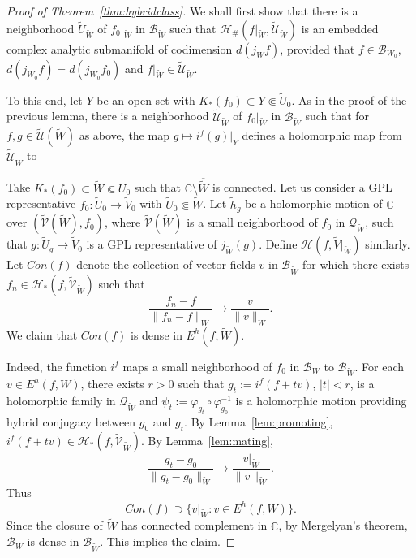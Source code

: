 \documentclass{amsart}
\numberwithin{equation}{section}
\newcommand{\C}{\mathbb C}
\theoremstyle{definition}
\theoremstyle{remark}
\begin{document}
\begin{proof}[Proof of Theorem~\ref{thm:hybridclass}]
\iffalse
We shall first show that there is a neighborhood $\widetilde{U}_{\widetilde{W}}$ of $f_0|_{\widetilde{W}}$ in $\mathcal{B}_{\widetilde{W}}$ such that 
$\mathcal{H}_\#(f|_{\widetilde{W}}, \widetilde{\mathcal{U}}_{\widetilde{W}})$ is an embedded complex analytic submanifold of codimension $d(j_Wf)$, provided that $f\in \mathcal{B}_{W_0}$, $d(j_{W_0}f)= d(j_{W_0} f_0)$ and $f|_{\widetilde{W}}\in \widetilde{\mathcal{U}}_{\widetilde{W}}$.

To this end, let $Y$ be an open set with $K_*(f_0)\subset Y\Subset\widetilde{U}_0$.
As in the proof of the previous lemma, there is a neighborhood $\widetilde{\mathcal{U}}_{\widetilde{W}}$ of $f_0|_{\widetilde{W}}$ in $\mathcal{B}_{\widetilde{W}}$ such that for $f,g\in \widetilde{\mathcal{U}}(\widetilde{W})$ as above, 
the map $g\mapsto i^f(g)|_Y$ defines a holomorphic map from $\widetilde{\mathcal{U}}_{\widetilde{W}}$ to 

Take $K_*(f_0)\subset\widetilde{W}\Subset U_0$ such that $\C\setminus \overline{\widetilde{W}}$ is connected. Let us consider a GPL representative $f_0:\widetilde{U}_0\to \widetilde{V}_0$ with $\widetilde{U}_0\Subset \widetilde{W}$. Let $\widetilde{h}_g$ be a holomorphic motion of $\C$ over $(\widetilde{\mathcal{V}}(\widetilde{W}), f_0)$, where $\widetilde{\mathcal{V}}(\widetilde{W})$ is a small neighborhood of $f_0$ in $\mathcal{Q}_{\widetilde{W}}$, such that $g:\widetilde{U}_g\to \widetilde{V}_0$ 
is a GPL representative of $j_{\widetilde{W}}(g)$. 
Define $\mathcal{H}(f, \widetilde{V}|_{\widetilde{W}})$ similarly. 
Let $Con(f)$ denote the collection of vector fields $v$ in $\mathcal{B}_{\widetilde{W}}$ for which there exists $f_n\in \mathcal{H}_*(f,\widetilde{\mathcal{V}}_{\widetilde{W}})$ such that 
$$\frac{f_n-f}{\|f_n-f\|_{\widetilde{W}}}\to \frac{v}{\|v\|_{\widetilde{W}}}.$$
We claim that $Con(f)$ is dense in $E^h(f,{\widetilde{W}})$.

Indeed, the function $i^f$ maps a small neighborhood of $f_0$ in $\mathcal{B}_W$ to $\mathcal{B}_{\widetilde{W}}$. For each $v\in E^h(f, W)$, there exists $r>0$ such that $g_t :=i^f(f+tv)$, $|t|<r$, is a holomorphic family in $\mathcal{Q}_{\widetilde{W}}$ and $\psi_t:=\varphi_{g_t}\circ \varphi_{g_0}^{-1}$ is a holomorphic motion providing hybrid conjugacy between $g_0$ and $g_t$. By Lemma~\ref{lem:promoting}, $i^f(f+tv)\in \mathcal{H}_*(f, \widetilde{\mathcal{V}}_{\widetilde{W}})$. By Lemma~\ref{lem:mating}, 
$$\frac{g_t-g_0}{\|g_t-g_0\|_{\widetilde{W}}}\to \frac{v|_{\widetilde{W}}}{\|v\|_{\widetilde{W}}}.$$ 
Thus $$Con(f)\supset \{v|_{\widetilde{W}}: v\in E^h(f,W)\}.$$
Since the closure of $\widetilde{W}$ has connected complement in $\C$, by Mergelyan's theorem, $\mathcal{B}_W$ is dense in $\mathcal{B}_{\widetilde{W}}$. This implies the claim. 


\end{proof}
\end{document}
